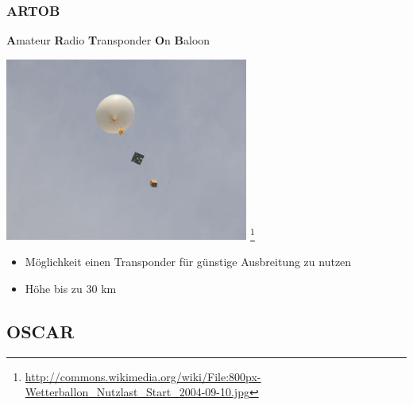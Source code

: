 \begin{frame}
    \frametitle{ARTOB}

    \textbf{A}mateur \textbf{R}adio \textbf{T}ransponder \textbf{O}n \textbf{B}aloon

    \begin{center}
        \includegraphics[width=0.6\textwidth]{bv11/Wetterballon_Nutzlast.jpg}
        \footnote{\tiny \url{http://commons.wikimedia.org/wiki/File:800px-Wetterballon_Nutzlast_Start_2004-09-10.jpg}}
    \end{center}

    \begin{itemize}
        \item Möglichkeit einen Transponder für günstige Ausbreitung zu nutzen
        \item Höhe bis zu 30 km
    \end{itemize}


\end{frame}

\subsection{OSCAR}

